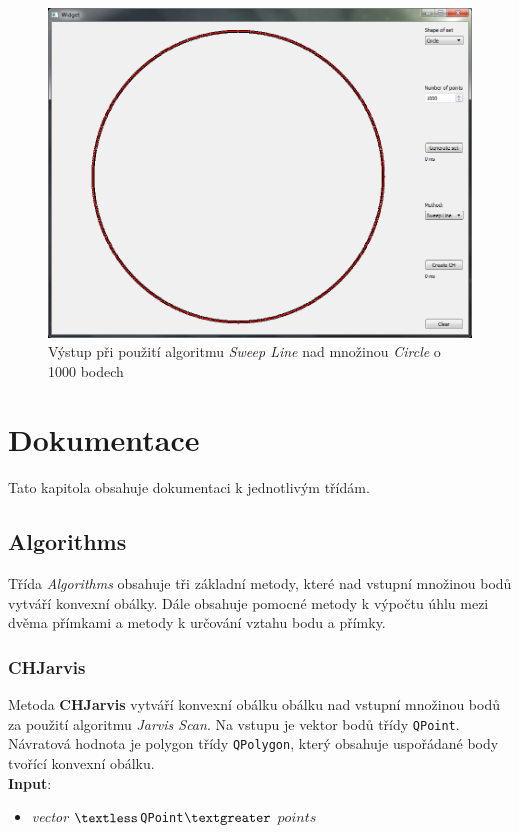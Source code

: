 \documentclass[a4paper, 12pt]{article}
\begin{document}
\begin{figure}[h!]
	\centering
	\includegraphics[width=13cm]{./pictures/app_circle_sweep.png}
	\caption{Výstup při použití algoritmu \textit{Sweep Line} nad množinou \textit{Circle} o 1000 bodech}
\end{figure}

\clearpage
 
\section{Dokumentace}
Tato kapitola obsahuje dokumentaci k jednotlivým třídám.

\subsection{Algorithms}
Třída \textit{Algorithms} obsahuje tři základní metody, které nad vstupní množinou bodů vytváří konvexní obálky. Dále obsahuje pomocné metody k výpočtu úhlu mezi dvěma přímkami a metody k určování vztahu bodu a přímky.

\subsubsection{CHJarvis}
Metoda \textbf{CHJarvis} vytváří konvexní obálku obálku nad vstupní množinou bodů za použití algoritmu \textit{Jarvis Scan}. Na vstupu je vektor bodů třídy \texttt{QPoint}. Návratová hodnota je polygon třídy \texttt{QPolygon}, který obsahuje uspořádané body tvořící konvexní obálku.\\

\textbf{Input}:
\begin{itemize}
\item \textsl{vector} $\textless$\texttt{QPoint}$\textgreater$ $points$
\end{itemize}
\end{document}
